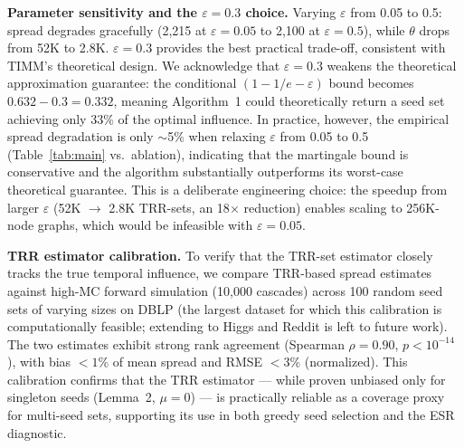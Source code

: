 \documentclass[10pt,conference]{IEEEtran}
\begin{document}
\textbf{Parameter sensitivity and the $\varepsilon=0.3$ choice.}
Varying $\varepsilon$ from 0.05 to 0.5: spread degrades gracefully (2,215 at $\varepsilon=0.05$ to 2,100 at $\varepsilon=0.5$), while $\theta$ drops from 52K to 2.8K.
$\varepsilon=0.3$ provides the best practical trade-off, consistent with TIMM's theoretical design.
We acknowledge that $\varepsilon=0.3$ weakens the theoretical approximation guarantee: the conditional $(1-1/e-\varepsilon)$ bound becomes $0.632-0.3=0.332$, meaning Algorithm~1 could theoretically return a seed set achieving only 33\% of the optimal influence.
In practice, however, the empirical spread degradation is only $\sim$5\% when relaxing $\varepsilon$ from 0.05 to 0.5 (Table~\ref{tab:main} vs.\ ablation), indicating that the martingale bound is conservative and the algorithm substantially outperforms its worst-case theoretical guarantee.
This is a deliberate engineering choice: the speedup from larger $\varepsilon$ (52K $\to$ 2.8K TRR-sets, an 18$\times$ reduction) enables scaling to 256K-node graphs, which would be infeasible with $\varepsilon=0.05$.

\textbf{TRR estimator calibration.}
To verify that the TRR-set estimator closely tracks the true temporal influence, we compare TRR-based spread estimates against high-MC forward simulation (10,000 cascades) across 100 random seed sets of varying sizes on DBLP (the largest dataset for which this calibration is computationally feasible; extending to Higgs and Reddit is left to future work).
The two estimates exhibit strong rank agreement (Spearman $\rho = 0.90$, $p < 10^{-14}$), with bias $<1\%$ of mean spread and RMSE $<3\%$ (normalized).
This calibration confirms that the TRR estimator — while proven unbiased only for singleton seeds (Lemma~2, $\mu{=}0$) — is practically reliable as a coverage proxy for multi-seed sets, supporting its use in both greedy seed selection and the ESR diagnostic.
\end{document}
